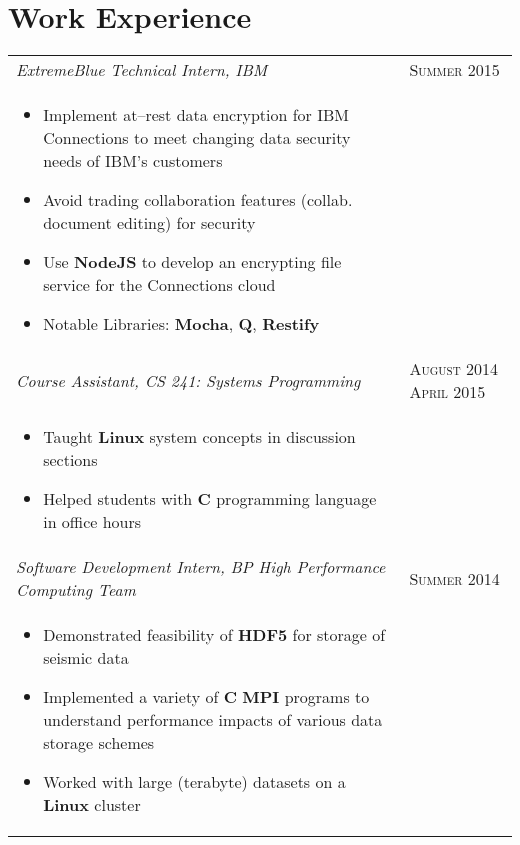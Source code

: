 \documentclass[letterpaper,10pt]{article}
\begin{document}
\section{Work Experience}
\begin{tabular}{p{12.8cm}>{\raggedleft\arraybackslash}p{3cm}}

    \emph{ExtremeBlue Technical Intern, IBM} & \textsc{Summer 2015} \\

    \vspace{-2mm}
    \begin{itemize}
        \item
            Implement at--rest data encryption for IBM Connections to meet
            changing data security needs of IBM's customers
        \item
            Avoid trading collaboration features (collab. document editing) for
            security
        \item
            Use \textbf{NodeJS} to develop an encrypting file service for the
            Connections cloud
        \item
            Notable Libraries: \textbf{Mocha}, \textbf{Q}, \textbf{Restify}
    \end{itemize} \\

    \emph{Course Assistant, CS 241: Systems Programming} &
    \textsc{August 2014 April 2015} \\

    \vspace{-6mm}
    \begin{itemize}
        \item
            Taught \textbf{Linux} system concepts in discussion sections
        \item
            Helped students with \textbf{C} programming language in office hours
    \end{itemize} \\

    \emph{Software Development Intern, BP High Performance Computing Team} &
    \textsc{Summer 2014} \\

    \vspace{-2mm}
    \begin{itemize}
        \item
            Demonstrated feasibility of \textbf{HDF5} for storage of seismic
            data
        \item
            Implemented a variety of \textbf{C} \textbf{MPI} programs to
            understand performance impacts of various data storage schemes
        \item
            Worked with large (terabyte) datasets on a \textbf{Linux} cluster


\end{itemize}
\end{tabular}
\end{document}
